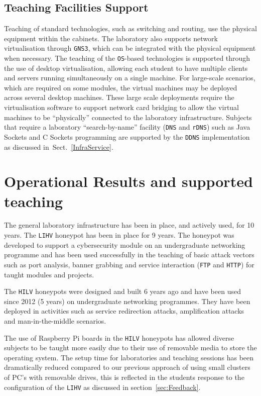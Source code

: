 \documentclass{ieeeaccess}
\begin{document}
\subsection{Teaching Facilities Support}

Teaching of standard technologies, such as switching and routing, use the
physical equipment within the cabinets. The laboratory also supports network
virtualisation through \texttt{GNS3}, which can be integrated with the physical
equipment when necessary. The teaching of the \texttt{OS}-based technologies is
supported through the use of desktop virtualisation, allowing each student to
have multiple clients and servers running simultaneously on a single machine.
For large-scale scenarios, which are required on some modules, the virtual
machines may be deployed across several desktop machines. These large scale
deployments require the virtualisation software to support network card
bridging to allow the virtual machines to be ``physically'' connected to the
laboratory infrastructure.  Subjects that require a laboratory
``search-by-name'' facility (\texttt{DNS} and \texttt{rDNS}) such as Java
Sockets and C Sockets programming are supported by the \texttt{DDNS}
implementation as discussed in~Sect.~\ref{InfraService}.

\section{Operational Results and supported teaching}\label{sec:Results}

The general laboratory infrastructure has been in place, and actively used, for
10 years. The \texttt{LIHV} honeypot has been in place for 9 years. The
honeypot was developed to support a cybersecurity module on an undergraduate
networking programme and has been used successfully in the teaching of basic
attack vectors such as port analysis, banner grabbing and service interaction
(\texttt{FTP} and \texttt{HTTP}) for taught modules and projects.

The \texttt{HILV} honeypots were designed and built 6 years ago and have been
used since 2012 (5 years) on undergraduate networking programmes. They have been
deployed in activities such as service redirection attacks, amplification
attacks and man-in-the-middle scenarios.

The use of Raspberry Pi boards in the \texttt{HILV} honeypots has allowed
diverse subjects to be taught more easily due to their use of removable media
to store the operating system. The setup time for laboratories and teaching
sessions has been dramatically reduced compared to our previous approach of
using small clusters of PC's with removable drives, this is reflected in the
students response to the configuration of the \texttt{LIHV} as discussed in
section~\ref{sec:Feedback}.
\end{document}
